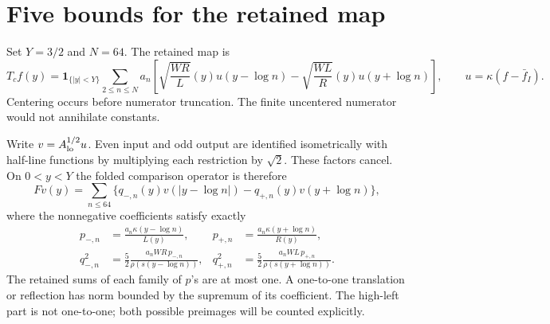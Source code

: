 \documentclass[11pt]{article}
\theoremstyle{remark}\newtheorem{remark}[theorem]{Remark}
\numberwithin{equation}{section}
\begin{document}
\section{Five bounds for the retained map}\label{sec:branches}
Set $Y=3/2$ and $N=64$. The retained map is
\begin{equation}\label{eq:Tc}
 T_cf(y)=\mathbf1_{\{|y|<Y\}}\sum_{2\le n\le N}a_n
 \left[\sqrt{\frac{WR}{L}}(y)u(y-\log n)
       -\sqrt{\frac{WL}{R}}(y)u(y+\log n)\right],
 \qquad u=\kappa(f-\bar f_I).
\end{equation}
Centering occurs before numerator truncation. The finite uncentered numerator would not annihilate constants.

Write $v=A_{\rm lo}^{1/2}u$. Even input and odd output are identified isometrically with half-line functions by multiplying each restriction by $\sqrt2$. These factors cancel. On $0<y<Y$ the folded comparison operator is therefore
\begin{equation}\label{eq:folded}
 Fv(y)=\sum_{n\le64}\{q_{-,n}(y)v(|y-\log n|)
                         -q_{+,n}(y)v(y+\log n)\},
\end{equation}
where the nonnegative coefficients satisfy exactly
\begin{align}
 p_{-,n}&=\frac{a_n\kappa(y-\log n)}{L(y)},&
 p_{+,n}&=\frac{a_n\kappa(y+\log n)}{R(y)},\label{eq:prob}\\
 q_{-,n}^2&=\frac52\frac{a_nW R\,p_{-,n}}{\rho(s(y-\log n))},&
 q_{+,n}^2&=\frac52\frac{a_nW L\,p_{+,n}}{\rho(s(y+\log n))}.
 \label{eq:q}
\end{align}
The retained sums of each family of $p$'s are at most one. A one-to-one translation or reflection has norm bounded by the supremum of its coefficient. The high-left part is not one-to-one; both possible preimages will be counted explicitly.
\end{document}

